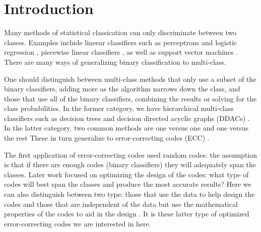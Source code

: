 
\section{Introduction}

Many methods of statistical classication can only discriminate between two classes. 
Examples include lineear classifiers such as perceptrons and logistic regression \citep{Michie_etal1994}, 
piecewise linear classifiers \citep{Herman_Yeung1992,Mills2018},
as well as support vector machines \citep{kernel_intro}.
There are many ways of generalizing binary classification to 
multi-class.

One should distinguish between multi-class methods that only use a subset
of the binary classifiers, adding more as the algorithm narrows down the
class, and those that use all of the binary classifiers, combining the results
or solving for the class probabilities.
In the former category, we have hierarchical multi-class classifiers 
such as decision trees \citep{Cheong_etal2004,Lee_Oh2003} and decision
directed acyclic graphs (DDACs) \citep{Platt_etal2000}.
In the latter category,
two common methods are one versus one and one versus the rest \citep{Hsu_Lin2002}
These in turn generalize to error-correcting codes (ECC) \citep{Dietterich_Bakiri1995}.

The first application of error-correcting codes used random codes:
the assumption is that if there are enough codes (binary classifiers)
they will adequately span the classes.
Later work focused on optimizing the design of the codes: what type of
codes will best span the classes and produce the most accurate results?
Here we can also distinguish between two type: those that use the data
to help design the codes \citep{Crammer_Singer2002,Zhou_etal2008,Zhong_Cheriet2013}
and those that are independent of the data but use the mathematical 
properties of the codes to aid in the design \citep{Allwein_etal2000,Windeatt_Ghaderi2002,Zhou_etal2019}.
It is these latter type of optimized error-correcting codes we are interested in here.

